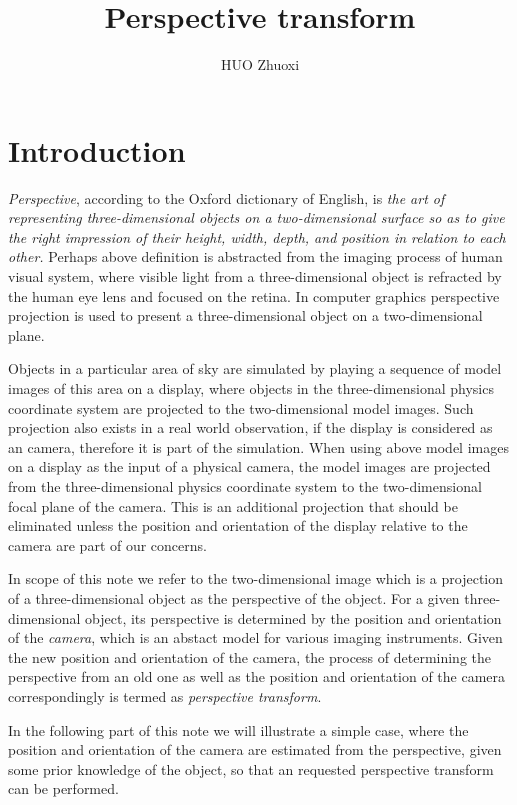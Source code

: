 \documentclass{article}
\title{Perspective transform}
\author{HUO Zhuoxi}
\begin{document}
\maketitle
\section{Introduction}
\emph{Perspective}, according to the Oxford dictionary of English, is
\emph{the art of representing three-dimensional objects on a two-dimensional surface so as to give the right impression of their height, width, depth, and position in relation to each other.}
Perhaps above definition is abstracted from the imaging process of human visual system, where visible light from a three-dimensional object is refracted by the human eye lens and focused on the retina.
In computer graphics perspective projection is used to present a three-dimensional object on a two-dimensional plane.

Objects in a particular area of sky are simulated by playing a sequence of model images of this area on a display,
where objects in the three-dimensional physics coordinate system are projected to the two-dimensional model images.
Such projection also exists in a real world observation, if the display is considered as an camera, therefore it is part of the simulation.
When using above model images on a display as the input of a physical camera,
the model images are projected from the three-dimensional physics coordinate system to the two-dimensional focal plane of the camera.
This is an additional projection that should be eliminated unless the position and orientation of the display relative to the camera are part of our concerns.

In scope of this note we refer to the two-dimensional image which is a projection of a three-dimensional object as the perspective of the object.
For a given three-dimensional object, its perspective is determined by the position and orientation of the \emph{camera},
which is an abstact model for various imaging instruments.
Given the new position and orientation of the camera,
the process of determining the perspective from an old one as well as the position and orientation of the camera correspondingly is termed as
\emph{perspective transform}.

In the following part of this note we will illustrate a simple case,
where the position and orientation of the camera are estimated from the perspective,
given some prior knowledge of the object,
so that an requested perspective transform can be performed.
\end{document}
